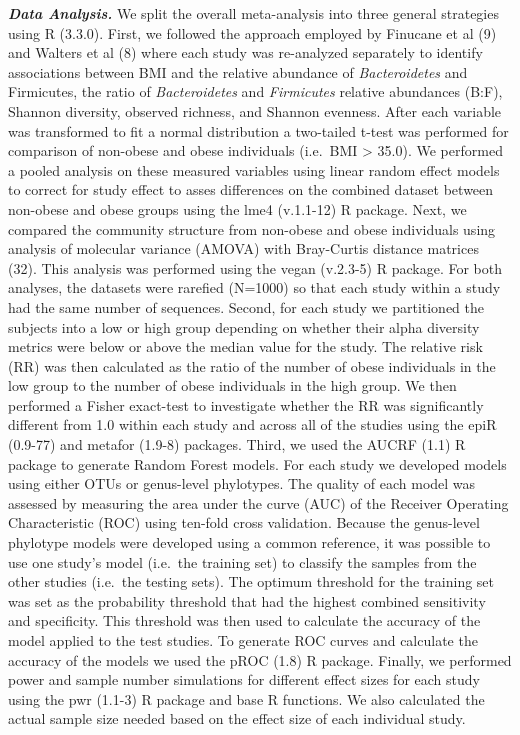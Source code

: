 \documentclass[12pt,]{article}
\begin{document}
\textbf{\emph{Data Analysis.}} We split the overall meta-analysis into
three general strategies using R (3.3.0). First, we followed the
approach employed by Finucane et al (9) and Walters et al (8) where each
study was re-analyzed separately to identify associations between BMI
and the relative abundance of \emph{Bacteroidetes} and Firmicutes, the
ratio of \emph{Bacteroidetes} and \emph{Firmicutes} relative abundances
(B:F), Shannon diversity, observed richness, and Shannon evenness. After
each variable was transformed to fit a normal distribution a two-tailed
t-test was performed for comparison of non-obese and obese individuals
(i.e.~BMI \textgreater{} 35.0). We performed a pooled analysis on these
measured variables using linear random effect models to correct for
study effect to asses differences on the combined dataset between
non-obese and obese groups using the lme4 (v.1.1-12) R package. Next, we
compared the community structure from non-obese and obese individuals
using analysis of molecular variance (AMOVA) with Bray-Curtis distance
matrices (32). This analysis was performed using the vegan (v.2.3-5) R
package. For both analyses, the datasets were rarefied (N=1000) so that
each study within a study had the same number of sequences. Second, for
each study we partitioned the subjects into a low or high group
depending on whether their alpha diversity metrics were below or above
the median value for the study. The relative risk (RR) was then
calculated as the ratio of the number of obese individuals in the low
group to the number of obese individuals in the high group. We then
performed a Fisher exact-test to investigate whether the RR was
significantly different from 1.0 within each study and across all of the
studies using the epiR (0.9-77) and metafor (1.9-8) packages. Third, we
used the AUCRF (1.1) R package to generate Random Forest models. For
each study we developed models using either OTUs or genus-level
phylotypes. The quality of each model was assessed by measuring the area
under the curve (AUC) of the Receiver Operating Characteristic (ROC)
using ten-fold cross validation. Because the genus-level phylotype
models were developed using a common reference, it was possible to use
one study's model (i.e.~the training set) to classify the samples from
the other studies (i.e.~the testing sets). The optimum threshold for the
training set was set as the probability threshold that had the highest
combined sensitivity and specificity. This threshold was then used to
calculate the accuracy of the model applied to the test studies. To
generate ROC curves and calculate the accuracy of the models we used the
pROC (1.8) R package. Finally, we performed power and sample number
simulations for different effect sizes for each study using the pwr
(1.1-3) R package and base R functions. We also calculated the actual
sample size needed based on the effect size of each individual study.
\end{document}
